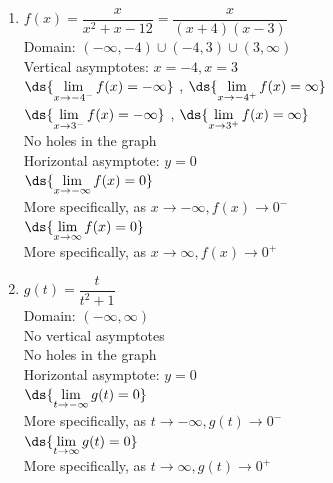 \documentclass{ximera}
\begin{document}
\pagebreak 

\begin{multicols}{2}
\begin{enumerate}
\setcounter{enumi}{\value{HW}}

\item $f(x) = \dfrac{x}{x^{2} + x - 12} = \dfrac{x}{(x + 4)(x - 3)}$\\
Domain: $(-\infty, -4) \cup (-4, 3) \cup (3, \infty)$\\
Vertical asymptotes: $x = -4, x = 3$\\
$\ds{\lim_{x \rightarrow -4^{-}} f(x) =  -\infty}$ , $\ds{\lim_{x \rightarrow -4^{+}} f(x) =  \infty}$ \\
$\ds{\lim_{x \rightarrow 3^{-}} f(x) =  -\infty}$ , $\ds{\lim_{x \rightarrow 3^{+}} f(x) =  \infty}$ \\
No holes in the graph\\
Horizontal asymptote: $y = 0$ \\
$\ds{\lim_{x \rightarrow - \infty} f(x) = 0}$\\
More specifically, as  $x \rightarrow -\infty, f(x) \rightarrow 0^{-}$\\
$\ds{\lim_{x \rightarrow  \infty} f(x) = 0}$\\
More specifically, as $x \rightarrow \infty, f(x) \rightarrow 0^{+}$\\



\columnbreak


\item $g(t) = \dfrac{t}{t^{2} + 1}$\\
Domain: $(-\infty, \infty)$\\
No vertical asymptotes\\
No holes in the graph\\
Horizontal asymptote: $y = 0$ \\
$\ds{\lim_{t \rightarrow  - \infty} g(t) = 0}$\\
More specifically, as $t \rightarrow -\infty, g(t) \rightarrow 0^{-}$\\
$\ds{\lim_{t \rightarrow   \infty} g(t) = 0}$\\
More specifically, as $t \rightarrow \infty, g(t) \rightarrow 0^{+}$\\

\setcounter{HW}{\value{enumi}}
\end{enumerate}
\end{multicols}
\end{document}
